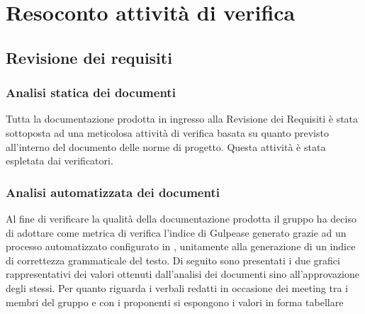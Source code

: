 \section{Resoconto attività di verifica} \label{_resocontoVerifica}
\subsection{Revisione dei requisiti}
\subsubsection{Analisi statica dei documenti}
Tutta la documentazione prodotta in ingresso alla Revisione dei Requisiti è stata sottoposta ad una meticolosa attività di verifica
basata su quanto previsto all'interno del documento delle norme di progetto.
Questa attività è stata espletata dai verificatori.

\subsubsection{Analisi automatizzata dei documenti}
Al fine di verificare la qualità della documentazione prodotta il gruppo ha deciso di adottare come metrica di verifica
l'indice di Gulpease generato grazie ad un processo automatizzato configurato in \textit{}, unitamente alla generazione di un indice di 
correttezza grammaticale del testo.
Di seguito sono presentati i due grafici rappresentativi dei valori ottenuti dall'analisi dei documenti sino all'approvazione degli stessi.
Per quanto riguarda i verbali redatti in occasione dei meeting tra i membri del gruppo e con i proponenti si espongono i valori in forma tabellare


